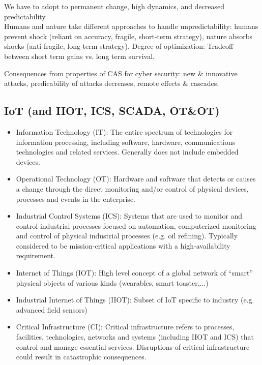 \documentclass[11pt,oneside,a4paper]{article}
\begin{document}
\noindent We have to adopt to permanent change, high dynamics, and decreased predictability.\\

Humans and nature take different approaches to handle unpredictability: humans prevent shock (reliant on accuracy, fragile, short-term strategy), nature absorbs shocks (anti-fragile, long-term strategy). Degree of optimization: Tradeoff between short term gains vs. long term survival.

\noindent Consequences from properties of CAS for cyber security: new \& innovative attacks, predicability of attacks decreases, remote effects \& cascades.

\subsection{IoT (and IIOT, ICS, SCADA, OT\&OT)}

\vspace{-\topsep}
\begin{itemize}
	\setlength{\itemsep}{0pt}
	\setlength{\parskip}{0pt}
	\item Information Technology (IT): The entire spectrum of technologies for information processing, including software, hardware, communications technologies and related services. Generally does not include embedded devices.
	\item Operational Technology (OT): Hardware and software that detects or causes a change through the direct monitoring and/or control of physical devices, processes and events in the
	enterprise.
	\item Industrial Control Systems (ICS): Systems that are used to monitor and control industrial processes focused on automation, computerized monitoring and control of physical industrial processes (e.g. oil refining). Typically considered to be mission-critical applications with a high-availability requirement.
	\item Internet of Things (IOT): High level concept of a global network of “smart” physical objects of various kinds (wearables, smart toaster,...)\
	\item Industrial Internet of Things (IIOT): Subset of IoT specific to industry (e.g. advanced field sensors)
	\item Critical Infrastructure (CI): Critical infrastructure refers to processes, facilities, technologies, networks and systems (including IIOT and ICS) that control and manage essential services. Disruptions of critical infrastructure could result in catastrophic consequences.
\end{itemize}
\vspace{-\topsep}
\end{document}
